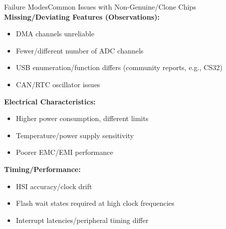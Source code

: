 \documentclass{beamer}
\begin{document}
\begin{frame}{Failure Modes}{Common Issues with Non-Genuine/Clone Chips}
	\textbf{Missing/Deviating Features (Observations):}
	\begin{itemize}
		\item DMA channels unreliable
		\item Fewer/different number of ADC channels
		\item USB enumeration/function differs (community reports, e.g., CS32)
		\item CAN/RTC oscillator issues
	\end{itemize}
	
	\medskip
	\textbf{Electrical Characteristics:}
	\begin{itemize}
		\item Higher power consumption, different limits
		\item Temperature/power supply sensitivity
		\item Poorer EMC/EMI performance
	\end{itemize}
	
	\medskip
	\textbf{Timing/Performance:}
	\begin{itemize}
		\item HSI accuracy/clock drift
		\item Flash wait states required at high clock frequencies
		\item Interrupt latencies/peripheral timing differ
	\end{itemize}
\end{frame}
\end{document}
